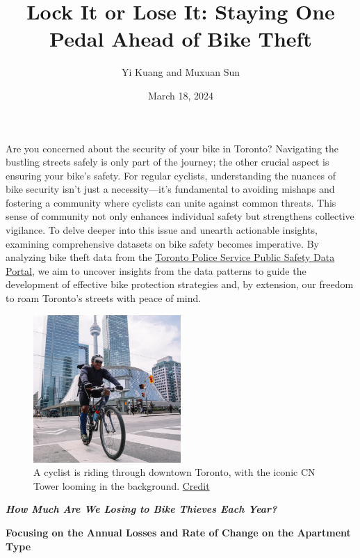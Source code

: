 \documentclass[
  11pt,
]{article}
\title{Lock It or Lose It: Staying One Pedal Ahead of Bike Theft}
\author{Yi Kuang and Muxuan Sun}
\date{March 18, 2024}
\begin{document}
\maketitle

\setlength{\parindent}{1cm}

\indent Are you concerned about the security of your bike in Toronto?
Navigating the bustling streets safely is only part of the journey; the
other crucial aspect is ensuring your bike's safety. For regular
cyclists, understanding the nuances of bike security isn't just a
necessity---it's fundamental to avoiding mishaps and fostering a
community where cyclists can unite against common threats. This sense of
community not only enhances individual safety but strengthens collective
vigilance. To delve deeper into this issue and unearth actionable
insights, examining comprehensive datasets on bike safety becomes
imperative. By analyzing bike theft data from the
\href{https://data.torontopolice.on.ca/pages/bicycle-thefts}{Toronto
Police Service Public Safety Data Portal}, we aim to uncover insights
from the data patterns to guide the development of effective bike
protection strategies and, by extension, our freedom to roam Toronto's
streets with peace of mind.

\begin{figure}
  \centering
    \includegraphics[width=0.5\textwidth]{"toronto_bikee.jpeg"}
  \caption*{\hspace{0.5cm} A cyclist is riding through downtown Toronto, with the iconic CN Tower looming in the background. \href{https://condoinvestments.ca/toronto-condos-and-neighbourhoods-with-the-best-bike-score/}{Credit}}
\end{figure}

\textit{\textbf{{How Much Are We Losing to Bike Thieves Each Year?}}}

\textbf{\footnotesize{Focusing on the Annual Losses and Rate of Change on the Apartment Type}}
\end{document}
